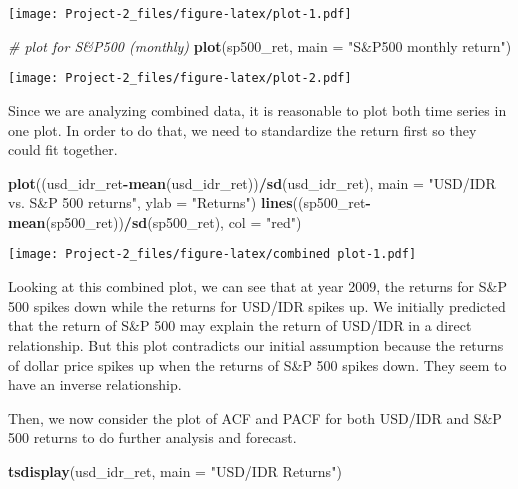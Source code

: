 \documentclass[]{article}
\newenvironment{Shaded}{\begin{snugshade}}{\end{snugshade}}
\newcommand{\KeywordTok}[1]{\textcolor[rgb]{0.13,0.29,0.53}{\textbf{#1}}}
\newcommand{\DataTypeTok}[1]{\textcolor[rgb]{0.13,0.29,0.53}{#1}}
\newcommand{\StringTok}[1]{\textcolor[rgb]{0.31,0.60,0.02}{#1}}
\newcommand{\CommentTok}[1]{\textcolor[rgb]{0.56,0.35,0.01}{\textit{#1}}}
\newcommand{\OperatorTok}[1]{\textcolor[rgb]{0.81,0.36,0.00}{\textbf{#1}}}
\newcommand{\NormalTok}[1]{#1}
\begin{document}
\texttt{[image: Project-2\_files/figure-latex/plot-1.pdf]}

\begin{Shaded}
\begin{Highlighting}[]
\CommentTok{# plot for S&P500 (monthly)}
\KeywordTok{plot}\NormalTok{(sp500_ret, }\DataTypeTok{main =} \StringTok{"S&P500 monthly return"}\NormalTok{) }
\end{Highlighting}
\end{Shaded}

\texttt{[image: Project-2\_files/figure-latex/plot-2.pdf]}

Since we are analyzing combined data, it is reasonable to plot both time
series in one plot. In order to do that, we need to standardize the
return first so they could fit together.

\begin{Shaded}
\begin{Highlighting}[]
\KeywordTok{plot}\NormalTok{((usd_idr_ret}\OperatorTok{-}\KeywordTok{mean}\NormalTok{(usd_idr_ret))}\OperatorTok{/}\KeywordTok{sd}\NormalTok{(usd_idr_ret), }\DataTypeTok{main =} \StringTok{"USD/IDR vs. S&P 500 returns"}\NormalTok{, }\DataTypeTok{ylab =} \StringTok{"Returns"}\NormalTok{)}
\KeywordTok{lines}\NormalTok{((sp500_ret}\OperatorTok{-}\KeywordTok{mean}\NormalTok{(sp500_ret))}\OperatorTok{/}\KeywordTok{sd}\NormalTok{(sp500_ret), }\DataTypeTok{col =} \StringTok{"red"}\NormalTok{)}
\end{Highlighting}
\end{Shaded}

\texttt{[image: Project-2\_files/figure-latex/combined plot-1.pdf]}

Looking at this combined plot, we can see that at year 2009, the returns
for S\&P 500 spikes down while the returns for USD/IDR spikes up. We
initially predicted that the return of S\&P 500 may explain the return
of USD/IDR in a direct relationship. But this plot contradicts our
initial assumption because the returns of dollar price spikes up when
the returns of S\&P 500 spikes down. They seem to have an inverse
relationship.

Then, we now consider the plot of ACF and PACF for both USD/IDR and S\&P
500 returns to do further analysis and forecast.

\begin{Shaded}
\begin{Highlighting}[]
\KeywordTok{tsdisplay}\NormalTok{(usd_idr_ret, }\DataTypeTok{main =} \StringTok{"USD/IDR Returns"}\NormalTok{)}
\end{Highlighting}
\end{Shaded}
\end{document}
